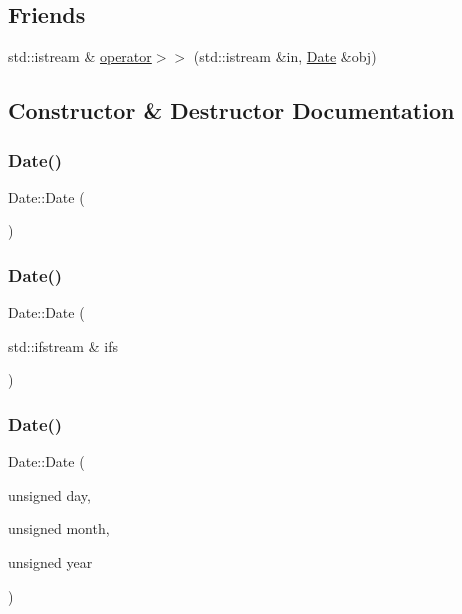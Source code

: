 \subsection*{Friends}
\begin{DoxyCompactItemize}
\item 
std\+::istream \& \hyperlink{classDate_a025d4abf4e083a5f10d376259aac34a2}{operator$>$$>$} (std\+::istream \&in, \hyperlink{classDate}{Date} \&obj)
\end{DoxyCompactItemize}


\subsection{Constructor \& Destructor Documentation}
\mbox{\label{classDate_a4e59ed4ba66eec61c27460c5d09fa1bd}} 
\subsubsection{\texorpdfstring{Date()}{Date()}\hspace{0.1cm}{\footnotesize\ttfamily [1/3]}}
{\footnotesize\ttfamily Date\+::\+Date (\begin{DoxyParamCaption}{ }\end{DoxyParamCaption})}

\mbox{\label{classDate_a5e72c9e6a4e666e260e989c2fd16beaf}} 
\subsubsection{\texorpdfstring{Date()}{Date()}\hspace{0.1cm}{\footnotesize\ttfamily [2/3]}}
{\footnotesize\ttfamily Date\+::\+Date (\begin{DoxyParamCaption}\item[{std\+::ifstream \&}]{ifs }\end{DoxyParamCaption})}

\mbox{\label{classDate_a6e4979dfc71c09cdab0b65a734e4a4df}} 
\subsubsection{\texorpdfstring{Date()}{Date()}\hspace{0.1cm}{\footnotesize\ttfamily [3/3]}}
{\footnotesize\ttfamily Date\+::\+Date (\begin{DoxyParamCaption}\item[{unsigned}]{day,  }\item[{unsigned}]{month,  }\item[{unsigned}]{year }\end{DoxyParamCaption})}



